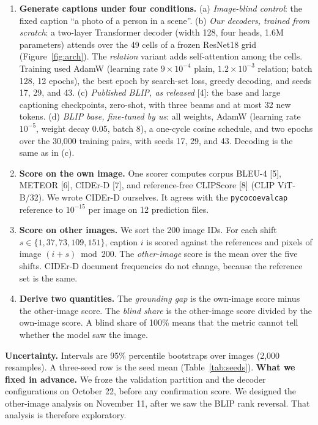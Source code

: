 \documentclass[11pt]{article}
\begin{document}
\begin{enumerate}[leftmargin=1.5em,itemsep=2pt]
\item \textbf{Generate captions under four conditions.}
(a) \emph{Image-blind control}: the fixed caption ``a photo of a person in a scene''.
(b) \emph{Our decoders, trained from scratch}: a two-layer Transformer decoder (width 128,
four heads, 1.6M parameters) attends over the 49 cells of a frozen ResNet18
grid (Figure~\ref{fig:arch}). The \emph{relation} variant adds self-attention among the cells. Training used AdamW (learning rate $9\times10^{-4}$ plain, $1.2\times10^{-3}$ relation;
batch 128, 12 epochs), the best epoch by search-set loss, greedy decoding, and
seeds 17, 29, and 43.
(c) \emph{Published BLIP, as released} [4]: the base and large captioning
checkpoints, zero-shot, with three beams and at most 32 new tokens.
(d) \emph{BLIP base, fine-tuned by us}: all weights, AdamW (learning rate $10^{-5}$,
weight decay 0.05, batch 8), a one-cycle cosine schedule, and two epochs
over the 30,000 training pairs, with seeds 17, 29, and 43. Decoding is the same as in (c).
\item \textbf{Score on the own image.} One scorer computes corpus BLEU-4
[5], METEOR [6], CIDEr-D [7],
and reference-free CLIPScore [8] (CLIP ViT-B/32). We wrote
CIDEr-D ourselves. It agrees with the \texttt{pycocoevalcap} reference to
$10^{-15}$ per image on 12 prediction files.
\item \textbf{Score on other images.} We sort the 200 image IDs. For each shift
$s \in \{1, 37, 73, 109, 151\}$, caption $i$ is scored against the references
and pixels of image $(i+s) \bmod 200$. The \emph{other-image} score is the mean
over the five shifts. CIDEr-D document frequencies do not change, because the
reference set is the same.
\item \textbf{Derive two quantities.} The \emph{grounding gap} is the own-image
score minus the other-image score. The \emph{blind share} is the other-image
score divided by the own-image score. A blind share of 100\% means that the
metric cannot tell whether the model saw the image.
\end{enumerate}

\textbf{Uncertainty.} Intervals are 95\% percentile bootstraps over images
(2,000 resamples). A three-seed row is the seed mean (Table~\ref{tab:seeds}).
\textbf{What we fixed in advance.} We froze the validation partition and the
decoder configurations on October 22, before any confirmation score. We
designed the other-image analysis on November 11, after we saw the BLIP rank
reversal. That analysis is therefore exploratory.
\end{document}
